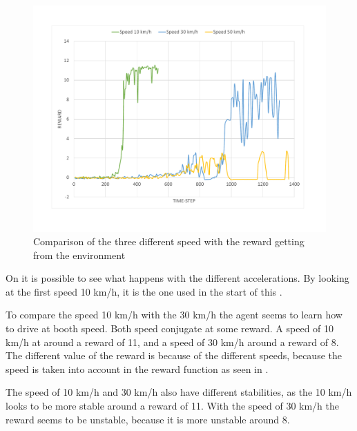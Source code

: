 \begin{figure}[H]
	\centering
	\includegraphics[width=1\textwidth]{Figures/Result/change_of_acceleration_reward_graph.pdf}
	\caption{Comparison of the three different speed with the reward getting from the environment}
	\label{fig:change_of_acceleration_reward_graph}
\end{figure} 


On  it is possible to see what happens with the different accelerations. By looking at the first speed 10 km/h, it is the one used in the start of this .

To compare the speed 10 km/h with the 30 km/h the agent seems to learn how to drive at booth speed. Both speed conjugate at some reward. A speed of 10 km/h at around a reward of 11, and a speed of 30 km/h around a reward of 8. The different value of the reward is because of the different speeds, because the speed is taken into account in the reward function as seen in . 

The speed of 10 km/h and 30 km/h also have different stabilities, as the 10 km/h looks to be more stable around a reward of 11. With the speed of 30 km/h the reward seems to be unstable, because it is more unstable around 8.

